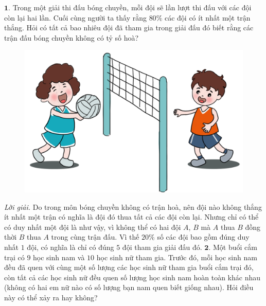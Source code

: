 \centering
\endgroup
\graphicspath{{../toancuabi/pic/}}
\vspace*{70pt}

\begin{multicols}{2}
	$\pmb{1.}$	Trong một giải thi đấu bóng chuyền, mỗi đội sẽ lần lượt thi đấu với các đội còn lại hai lần. Cuối cùng người ta thấy rằng $80\%$ các đội có ít nhất một trận thắng. Hỏi có tất cả bao nhiêu đội đã tham gia trong giải đấu đó biết rằng các trận đấu bóng chuyền không có tỷ số hoà?
	\begin{figure}[H]
		\vspace*{-5pt}
		\centering
		\captionsetup{labelformat= empty, justification=centering}
		\includegraphics[width= 1\linewidth]{b5}
		\vspace*{-15pt}
	\end{figure}
	\textit{Lời giải.} 	Do trong môn bóng chuyền không có trận hoà, nên đội nào không thắng ít nhất một trận có nghĩa là đội đó thua tất cả các đội còn lại. Nhưng chỉ có thể có duy nhất một đội là như vậy, vì không thể có hai đội $A$, $B$ mà $A$ thua $B$ đồng thời $B$ thua $A$ trong cùng trận đấu. Vì thế $20\%$ số các đội bao gồm đúng duy nhất $1$ đội, có nghĩa là  chỉ có đúng $5$ đội tham gia giải đấu đó.
	\vskip 0.1cm
	$\pmb{2.}$	Một buổi cắm trại có $9$ học sinh nam và $10$ học sinh nữ tham gia. Trước đó, mỗi học sinh nam đều đã quen với cùng một số lượng các học sinh nữ tham gia buổi cắm trại đó, còn tất cả các học sinh nữ đều quen số lượng học sinh nam hoàn toàn khác nhau (không có hai em nữ nào có số lượng bạn nam quen biết giống nhau). Hỏi điều này có thể xảy ra hay không?
	\begin{figure}[H]
		\vspace*{5pt}
		\centering
		\captionsetup{labelformat= empty, justification=centering}

\end{figure}
\end{multicols}
